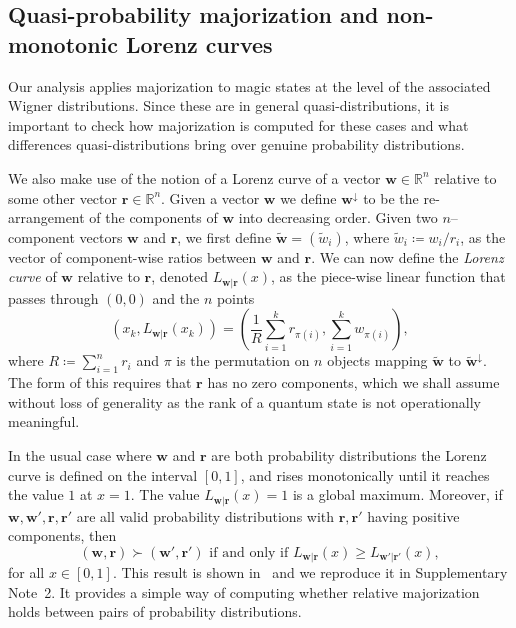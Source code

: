 \documentclass[
onecolumn,
superscriptaddress
]{revtex4-1}
\newcommand{\revhigh}[1]{{\color{red}#1}}
\def\r{\boldsymbol{r}}
\def\w{\boldsymbol{w}}
\begin{document}
\subsection*{Quasi-probability majorization and non-monotonic Lorenz curves}

Our analysis applies majorization to magic states at the level of the associated Wigner distributions. Since these are in general quasi-distributions, it is important to check how majorization is computed for these cases and what differences quasi-distributions bring over genuine probability distributions.

We also make use of the notion of a Lorenz curve of a vector $\w \in \mathbb{R}^n$ relative to some other vector $\r \in \mathbb{R}^n$. Given a vector $\w$ we define $\w^\downarrow$ to be the re-arrangement of the components of $\w$ into decreasing order. Given two $n$--component vectors $\w$ and $\r$, we first define $\widetilde{\w}=(\widetilde{w}_i)$, where $\widetilde{w}_i \coloneqq w_i/r_i$, as the vector of component-wise ratios between $\w$ and $\r$.
We can now define the \emph{Lorenz curve} of $\w$ relative to $\r$, denoted $L_{\w|\r}(x)$, as the piece-wise linear function that passes through $(0,0)$ and the $n$ points
\begin{equation}\label{eq:lc}
	(x_k,L_{\w|\r}(x_k)) =\left( \frac{1}{R}\sum_{i=1}^k r_{\pi(i)}, \sum_{i=1}^k w_{\pi(i)} \right),
\end{equation}
where $R\coloneqq \sum_{i=1}^n r_i$ and $\pi$ is the permutation on $n$ objects mapping $\widetilde{\w}$ to $\widetilde{\w}^{\downarrow}$. The form of this requires that $\r$ has no zero components, which we shall assume without loss of generality as the rank of a quantum state is not operationally meaningful.

In the usual case where $\w$ and $\r$ are both probability distributions the Lorenz curve is defined on the interval $[0,1]$, and rises monotonically until it reaches the value $1$ at $x=1$. The value $L_{\w|\r}(x) = 1$ is a global maximum. Moreover, if $\w, \w', \r, \r'$ are all valid probability distributions with $\r,\r'$ having positive components, then
\begin{equation*}
(\w, \r) \succ (\w', \r') \mbox{ if and only if } L_{\w |\r}(x) \ge L_{\w' |\r'}(x),
\end{equation*}
for all $x \in [0,1]$. 
\revhigh{This result is shown in~\cite{ruch_mixing_1978} and we reproduce it in Supplementary Note~2.}
It provides a simple way of computing whether relative majorization holds between pairs of probability distributions.
\end{document}
